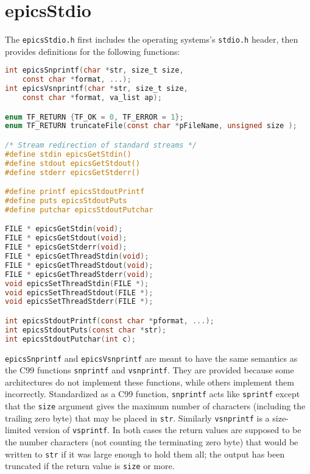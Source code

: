 \section{epicsStdio}

The \verb|epicsStdio.h| first includes the operating systems's \verb|stdio.h| header, then provides definitions for the following functions:

\begin{lstlisting}[language=C]
int epicsSnprintf(char *str, size_t size,
    const char *format, ...);
int epicsVsnprintf(char *str, size_t size,
    const char *format, va_list ap);

enum TF_RETURN {TF_OK = 0, TF_ERROR = 1};
enum TF_RETURN truncateFile(const char *pFileName, unsigned size );

/* Stream redirection of standard streams */
#define stdin epicsGetStdin()
#define stdout epicsGetStdout()
#define stderr epicsGetStderr()

#define printf epicsStdoutPrintf
#define puts epicsStdoutPuts
#define putchar epicsStdoutPutchar

FILE * epicsGetStdin(void);
FILE * epicsGetStdout(void);
FILE * epicsGetStderr(void);
FILE * epicsGetThreadStdin(void);
FILE * epicsGetThreadStdout(void);
FILE * epicsGetThreadStderr(void);
void epicsSetThreadStdin(FILE *);
void epicsSetThreadStdout(FILE *);
void epicsSetThreadStderr(FILE *);

int epicsStdoutPrintf(const char *pformat, ...);
int epicsStdoutPuts(const char *str);
int epicsStdoutPutchar(int c);
\end{lstlisting}

\verb|epicsSnprintf| and \verb|epicsVsnprintf| are meant to have the same semantics as the C99 functions \verb|snprintf| and \verb|vsnprintf|.
They are provided because some architectures do not implement these functions, while others implement them incorrectly.
Standardized as a C99 function, \verb|snprintf| acts like \verb|sprintf| except that the \verb|size| argument gives the maximum number of characters (including the trailing zero byte) that may be placed in \verb|str|.
Similarly \verb|vsnprintf| is a size-limited version of \verb|vsprintf|.
In both cases the return values are supposed to be the number characters (not counting the terminating zero byte) that would be written to \verb|str| if it was large enough to hold them all; the output has been truncated if the return value is \verb|size| or more.

